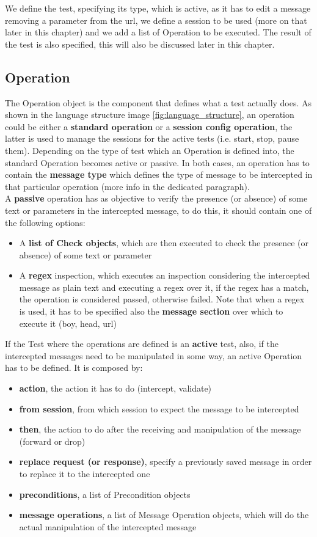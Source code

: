 We define the test, specifying its type, which is active, as it has to edit a message removing a parameter from the url, we define a session to be used (more on that later in this chapter) and we add a list of Operation to be executed. The result of the test is also specified, this will also be discussed later in this chapter.

\subsection{Operation}
The Operation object is the component that defines what a test actually does. As shown in the language structure image \ref{fig:language_structure}, an operation could be either a \textbf{standard operation} or a \textbf{session config operation}, the latter is used to manage the sessions for the active tests (i.e. start, stop, pause them). Depending on the type of test which an Operation is defined into, the standard Operation becomes active or passive.
In both cases, an operation has to contain the \textbf{message type} which defines the type of message to be intercepted in that particular operation (more info in the dedicated paragraph).
\\A \textbf{passive} operation has as objective to verify the presence (or absence) of some text or parameters in the intercepted message, to do this, it should contain one of the following options:
\begin{itemize}
    \item A \textbf{list of Check objects}, which are then executed to check the presence (or absence) of some text or parameter
    \item A \textbf{regex} inspection, which executes an inspection considering the intercepted message as plain text and executing a regex over it, if the regex has a match, the operation is considered passed, otherwise failed. Note that when a regex is used, it has to be specified also the \textbf{message section} over which to execute it (boy, head, url)
\end{itemize}

If the Test where the operations are defined is an \textbf{active} test, also, if the intercepted messages need to be manipulated in some way, an active Operation has to be defined. It is composed by:
\begin{itemize}
    \item \textbf{action}, the action it has to do (intercept, validate)
    \item \textbf{from session}, from which session to expect the message to be intercepted
    \item \textbf{then}, the action to do after the receiving and manipulation of the message (forward or drop)
    \item \textbf{replace request (or response)}, specify a previously saved message in order to replace it to the intercepted one
    \item \textbf{preconditions}, a list of Precondition objects
    \item \textbf{message operations}, a list of Message Operation objects, which will do the actual manipulation of the intercepted message
\end{itemize}

